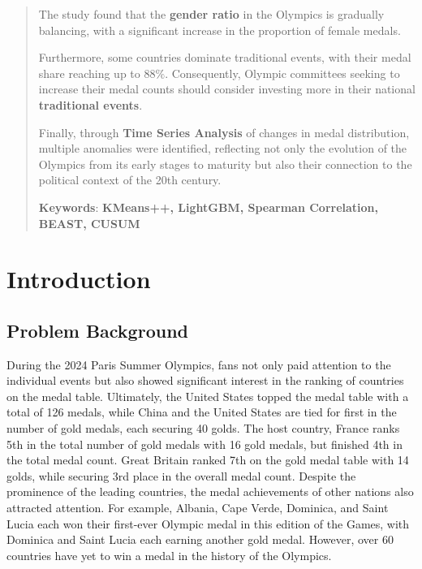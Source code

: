 \documentclass[12pt]{article}  %
\begin{document}
\begin{abstract}
	The study found that the \textbf{gender ratio} in the Olympics is gradually balancing, with a significant increase in the proportion of female medals.
	
	Furthermore, some countries dominate traditional events, with their medal share reaching up to \textbf{\( 88\% \)}. Consequently, Olympic committees seeking to increase their medal counts should consider investing more in their national \textbf{traditional events}. 
	
	Finally, through \textbf{Time Series Analysis} of changes in medal distribution, multiple anomalies were identified, reflecting not only the evolution of the Olympics from its early stages to maturity but also their connection to the political context of the 20th century.
	
	
	
	
	
	
	\vspace{5pt}
	\textbf{Keywords}: \textbf{ KMeans++, LightGBM, Spearman Correlation, BEAST, CUSUM }
	
	
\end{abstract}
	


\maketitle  %
\tableofcontents  %


\section{Introduction}
\subsection{Problem Background}
During the 2024 Paris Summer Olympics, fans not only paid attention to the individual events but also showed significant interest in the ranking of countries on the medal table. Ultimately, the United States topped the medal table with a total of 126 medals, while China and the United States are tied for first in the number of gold medals, each securing 40 golds. The host country, France ranks 5th in the total number of gold medals with 16 gold medals, but finished 4th in the total medal count. Great Britain ranked 7th on the gold medal table with 14 golds, while securing 3rd place in the overall medal count. Despite the prominence of the leading countries, the medal achievements of other nations also attracted attention. For example, Albania, Cape Verde, Dominica, and Saint Lucia each won their first-ever Olympic medal in this edition of the Games, with Dominica and Saint Lucia each earning another gold medal. However, over 60 countries have yet to win a medal in the history of the Olympics. 
\end{document}
